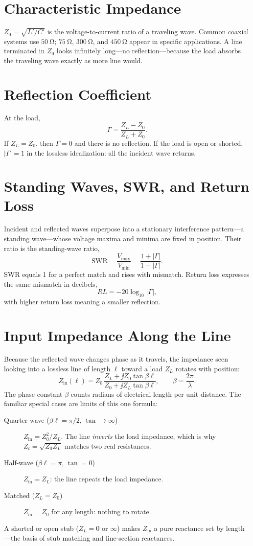 \section{Characteristic Impedance}
\(Z_0=\sqrt{L'/C'}\) is the voltage-to-current ratio of a traveling wave. Common
coaxial systems use \(\SI{50}{\ohm}\); \(\SI{75}{\ohm}\), \(\SI{300}{\ohm}\), and
\(\SI{450}{\ohm}\) appear in specific applications. A line terminated in \(Z_0\)
looks infinitely long---no reflection---because the load absorbs the traveling
wave exactly as more line would.

\section{Reflection Coefficient}
At the load,
\[
\Gamma=\frac{Z_L-Z_0}{Z_L+Z_0}.
\]
If \(Z_L=Z_0\), then \(\Gamma=0\) and there is no reflection. If the load is open
or shorted, \(|\Gamma|=1\) in the lossless idealization: all the incident wave
returns.

\section{Standing Waves, SWR, and Return Loss}
Incident and reflected waves superpose into a stationary interference pattern---a
standing wave---whose voltage maxima and minima are fixed in position. Their ratio
is the standing-wave ratio,
\[
\mathrm{SWR}=\frac{V_{\max}}{V_{\min}}=\frac{1+|\Gamma|}{1-|\Gamma|}.
\]
SWR equals 1 for a perfect match and rises with mismatch. Return loss expresses
the same mismatch in decibels,
\[
RL=-20\log_{10}|\Gamma|,
\]
with higher return loss meaning a smaller reflection.

\section{Input Impedance Along the Line}
Because the reflected wave changes phase as it travels, the impedance seen
looking into a lossless line of length \(\ell\) toward a load \(Z_L\) rotates with
position:
\[
Z_{\mathrm{in}}(\ell)=Z_0\,
\frac{Z_L+\jj Z_0\tan\beta\ell}{Z_0+\jj Z_L\tan\beta\ell},
\qquad
\beta=\frac{2\pi}{\lambda}.
\]
The phase constant \(\beta\) counts radians of electrical length per unit
distance. The familiar special cases are limits of this one formula:
\begin{description}
\item[Quarter-wave (\(\beta\ell=\pi/2\), \(\tan\to\infty\))]
\(Z_{\mathrm{in}}=Z_0^2/Z_L\). The line \emph{inverts} the load impedance, which
is why \(Z_t=\sqrt{Z_0 Z_L}\) matches two real resistances.
\item[Half-wave (\(\beta\ell=\pi\), \(\tan=0\))] \(Z_{\mathrm{in}}=Z_L\): the line
repeats the load impedance.
\item[Matched (\(Z_L=Z_0\))] \(Z_{\mathrm{in}}=Z_0\) for any length: nothing to
rotate.
\end{description}
A shorted or open stub (\(Z_L=0\) or \(\infty\)) makes \(Z_{\mathrm{in}}\) a pure
reactance set by length---the basis of stub matching and line-section reactances.

